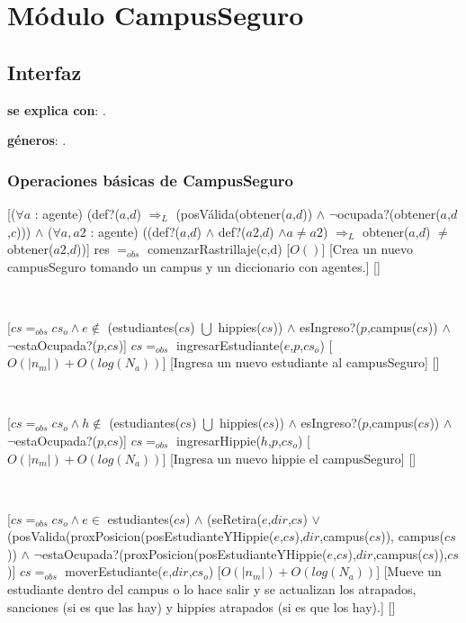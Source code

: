 \section{Módulo CampusSeguro}

\subsection{Interfaz}

\textbf{se explica con}: .

\textbf{géneros}: .

\subsubsection{Operaciones básicas de CampusSeguro}

[($\forall a$ : agente) (def?($a$,$d$) $\Rightarrow_L$ (posVálida(obtener($a$,$d$)) $\land$ $\neg$ocupada?(obtener($a$,$d$,$c$))) $\land$ ($\forall a, a2$ : agente) ((def?($a$,$d$) $\land$ def?($a2$,$d$) $\land a \neq a2$) $\Rightarrow_L$ obtener($a$,$d$) $\neq$ obtener($a2$,$d$))]
{res $=_{obs}$ comenzarRastrillaje(c,d)}
[$O()$]
[Crea un nuevo campusSeguro tomando un campus y un diccionario con agentes.]
[]

~

[$cs =_{obs} cs_o \land e \not\in$ (estudiantes($cs$) $\bigcup$ hippies($cs$)) $\land$ esIngreso?($p$,campus($cs$)) $\land$ $\neg$estaOcupada?($p$,$cs$)]
{$cs =_{obs}$ ingresarEstudiante($e$,$p$,$cs_o$)}
[$O(|n_m|) + O(log(N_a))$]
[Ingresa un nuevo estudiante al campusSeguro]
[]

~

[$cs =_{obs} cs_o \land h \not\in$ (estudiantes($cs$) $\bigcup$ hippies($cs$)) $\land$ esIngreso?($p$,campus($cs$)) $\land$ $\neg$estaOcupada?($p$,$cs$)]
{$cs =_{obs}$ ingresarHippie($h$,$p$,$cs_o$)}
[$O(|n_m|) + O(log(N_a))$]
[Ingresa un nuevo hippie el campusSeguro]
[]

~

[$cs =_{obs} cs_o \land e \in$ estudiantes($cs$) $\land$ (seRetira($e$,$dir$,$cs$) $\lor$ \\
(posValida(proxPosicion(posEstudianteYHippie($e$,$cs$),$dir$,campus($cs$)), campus($cs$)) $\land$ $\neg$estaOcupada?(proxPosicion(posEstudianteYHippie($e$,$cs$),$dir$,campus($cs$)),$cs$)]
{$cs =_{obs}$ moverEstudiante($e$,$dir$,$cs_o$)}
[$O(|n_m|) + O(log(N_a))$]
[Mueve un estudiante dentro del campus o lo hace salir y se actualizan los atrapados, sanciones (si es que las hay) y hippies atrapados (si es que los hay).]
[]

